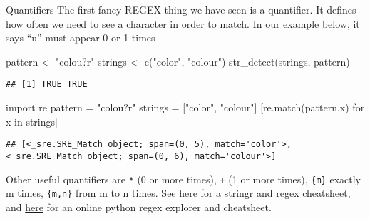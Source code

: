 \documentclass[
  10pt,
  ignorenonframetext,
  aspectratio=169]{beamer}
\newenvironment{Shaded}{\begin{snugshade}}{\end{snugshade}}
\newcommand{\ControlFlowTok}[1]{\textcolor[rgb]{0.94,0.87,0.69}{#1}}
\newcommand{\FunctionTok}[1]{\textcolor[rgb]{0.94,0.94,0.56}{#1}}
\newcommand{\ImportTok}[1]{\textcolor[rgb]{0.80,0.80,0.80}{#1}}
\newcommand{\KeywordTok}[1]{\textcolor[rgb]{0.94,0.87,0.69}{#1}}
\newcommand{\NormalTok}[1]{\textcolor[rgb]{0.80,0.80,0.80}{#1}}
\newcommand{\OperatorTok}[1]{\textcolor[rgb]{0.94,0.94,0.82}{#1}}
\newcommand{\OtherTok}[1]{\textcolor[rgb]{0.94,0.94,0.56}{#1}}
\newcommand{\StringTok}[1]{\textcolor[rgb]{0.80,0.58,0.58}{#1}}
\begin{document}
\begin{frame}[fragile]{Quantifiers}
\protect\hypertarget{quantifiers}{}
The first fancy REGEX thing we have seen is a quantifier. It defines how
often we need to see a character in order to match. In our example
below, it says ``u'' must appear 0 or 1 times

\scriptsize

\begin{Shaded}
\begin{Highlighting}[]
\NormalTok{pattern }\OtherTok{\textless{}{-}} \StringTok{"colou?r"}
\NormalTok{strings }\OtherTok{\textless{}{-}} \FunctionTok{c}\NormalTok{(}\StringTok{"color"}\NormalTok{, }\StringTok{"colour"}\NormalTok{)}
\FunctionTok{str\_detect}\NormalTok{(strings, pattern)}
\end{Highlighting}
\end{Shaded}

\begin{verbatim}
## [1] TRUE TRUE
\end{verbatim}

\begin{Shaded}
\begin{Highlighting}[]
\ImportTok{import}\NormalTok{ re}
\NormalTok{pattern }\OperatorTok{=} \StringTok{"colou?r"}
\NormalTok{strings }\OperatorTok{=}\NormalTok{ [}\StringTok{"color"}\NormalTok{, }\StringTok{"colour"}\NormalTok{]}
\NormalTok{[re.match(pattern,x) }\ControlFlowTok{for}\NormalTok{ x }\KeywordTok{in}\NormalTok{ strings]}
\end{Highlighting}
\end{Shaded}

\begin{verbatim}
## [<_sre.SRE_Match object; span=(0, 5), match='color'>, <_sre.SRE_Match object; span=(0, 6), match='colour'>]
\end{verbatim}

\normalsize

Other useful quantifiers are \texttt{*} (0 or more times), \texttt{+} (1
or more times), \texttt{\{m\}} exactly m times, \texttt{\{m,n\}} from m
to n times. See
\href{https://raw.githubusercontent.com/rstudio/cheatsheets/main/strings.pdf}{here}
for a stringr and regex cheatsheet, and \href{https://pythex.org/}{here}
for an online python regex explorer and cheatsheet.
\end{frame}
\end{document}
